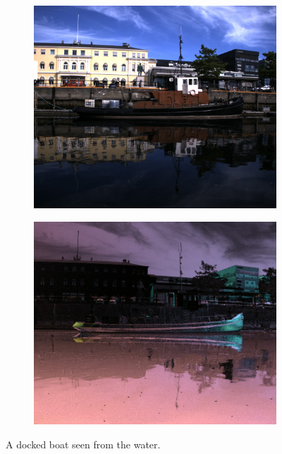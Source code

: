 \begin{figure}[H]
    \begin{subfigure}[T]{.49\textwidth}
        \includegraphics[width=\textwidth]{figures/pictures/img_4038_s0.jpg}
    \end{subfigure} \hfill
    \begin{subfigure}[T]{.49\textwidth}
        \includegraphics[width=\textwidth]{figures/pictures/img_4038_pol.jpg}
    \end{subfigure}
    \caption{A docked boat seen from the water.}
\end{figure}
\vspace{-.5cm}

